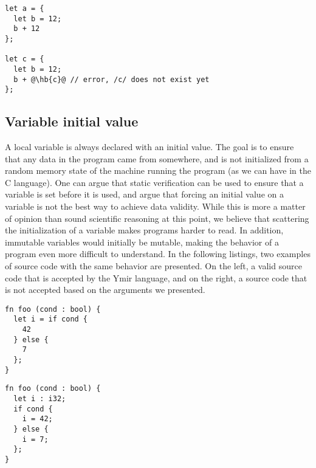 \begin{lstlisting}[style=coloredverbatim, escapechar=@]
let a = {
  let b = 12;
  b + 12
};

let c = {
  let b = 12;
  b + @\hb{c}@ // error, /c/ does not exist yet
};
\end{lstlisting}

\subsection{Variable initial value}
\label{sec:variable_init_value}

A local variable is always declared with an initial value. The goal is to ensure
that any data in the program came from somewhere, and is not initialized from a
random memory state of the machine running the program (as we can have in the C
language). One can argue that static verification can be used to ensure that a
variable is set before it is used, and argue that forcing an initial value on a
variable is not the best way to achieve data validity. While this is more a
matter of opinion than sound scientific reasoning at this point, we believe that
scattering the initialization of a variable makes programs harder to read. In
addition, immutable variables would initially be mutable, making the behavior of
a program even more difficult to understand. In the following listings, two
examples of source code with the same behavior are presented. On the left, a
valid source code that is accepted by the Ymir language, and on the right, a
source code that is not accepted based on the arguments we presented.

\hspace{-15pt}%
\begin{minipage}[t][][t]{0.47\linewidth}
  \begin{lstlisting}[style=coloredverbatim, escapechar=@, caption=Valid]
fn foo (cond : bool) {
  let i = if cond {
    42
  } else {
    7
  };
}
  \end{lstlisting}
\end{minipage}\hspace{10pt}%
\begin{minipage}[t][][t]{0.47\linewidth}
  \begin{lstlisting}[style=coloredverbatim, escapechar=@, caption=Invalid]
fn foo (cond : bool) {
  let i : i32;
  if cond {
    i = 42;
  } else {
    i = 7;
  };
}
  \end{lstlisting}
\end{minipage}

